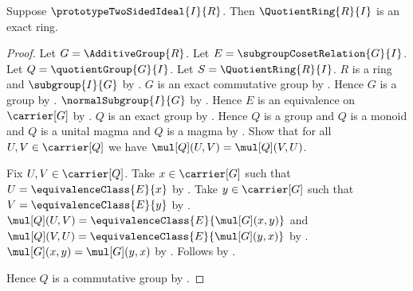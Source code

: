 \begin{theorem}\label{spike_quotient_ring_is_exact}
    Suppose $\prototypeTwoSidedIdeal{I}{R}$.
    Then $\QuotientRing{R}{I}$ is an exact ring.
\end{theorem}
\begin{proof}
    Let $G=\AdditiveGroup{R}$.
    Let $E=\subgroupCosetRelation{G}{I}$.
    Let $Q=\quotientGroup{G}{I}$.
    Let $S=\QuotientRing{R}{I}$.
    $R$ is a ring and $\subgroup{I}{G}$ by
        .
    $G$ is an exact commutative group by
        .
    Hence $G$ is a group by .
    $\normalSubgroup{I}{G}$ by
        .
    Hence $E$ is an equivalence on $\carrier[G]$ by
        .
    $Q$ is an exact group by .
    Hence $Q$ is a group and $Q$ is a monoid and
        $Q$ is a unital magma and $Q$ is a magma by
        .
    Show that for all $U,V\in\carrier[Q]$ we have
        $\mul[Q](U,V)=\mul[Q](V,U)$.
    \begin{subproof}
        Fix $U,V\in\carrier[Q]$.
        Take $x\in\carrier[G]$ such that
            $U=\equivalenceClass{E}{x}$ by
            .
        Take $y\in\carrier[G]$ such that
            $V=\equivalenceClass{E}{y}$ by
            .
        $\mul[Q](U,V)=\equivalenceClass{E}{\mul[G](x,y)}$ and
            $\mul[Q](V,U)=\equivalenceClass{E}{\mul[G](y,x)}$ by
            .
        $\mul[G](x,y)=\mul[G](y,x)$ by
            .
        Follows by \auto.
    \end{subproof}
    Hence $Q$ is a commutative group by
        .


\end{proof}
